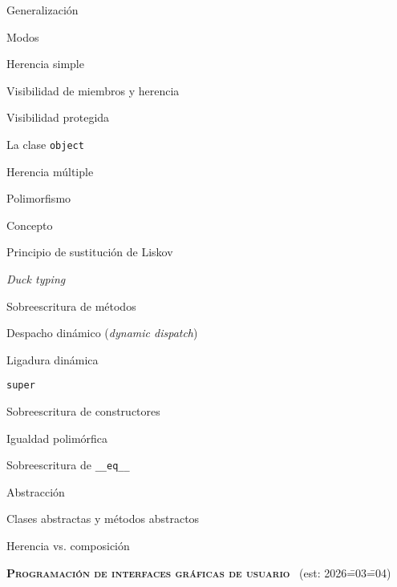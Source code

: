 \begin{longenum}
\begin{longenum}
        \begin{longenum}
            \item Generalización
            \item Modos
            \begin{longenum}
                \item Herencia simple
                \item Visibilidad de miembros y herencia
                \begin{longenum}
                    \item Visibilidad protegida
                \end{longenum}
                \item La clase \texttt{object}
                \item Herencia múltiple
            \end{longenum}
        \end{longenum}
        \item Polimorfismo
        \begin{longenum}
            \item Concepto
            \item Principio de sustitución de Liskov
            \item \textit{Duck typing}
            \item Sobreescritura de métodos
            \begin{longenum}
                \item Despacho dinámico (\textit{dynamic dispatch})
            \end{longenum}
            \item Ligadura dinámica
            \item \texttt{super}
            \item Sobreescritura de constructores
            \item Igualdad polimórfica
            \item Sobreescritura de \texttt{\_\_eq\_\_}
        \end{longenum}
        \item Abstracción
        \begin{longenum}
            \item Clases abstractas y métodos abstractos
        \end{longenum}
        \item Herencia vs. composición
    \end{longenum}
    \item \textbf{\textsc{Programación de interfaces gráficas de usuario}} \ (est: 2026\==03\==04)

\end{longenum}
